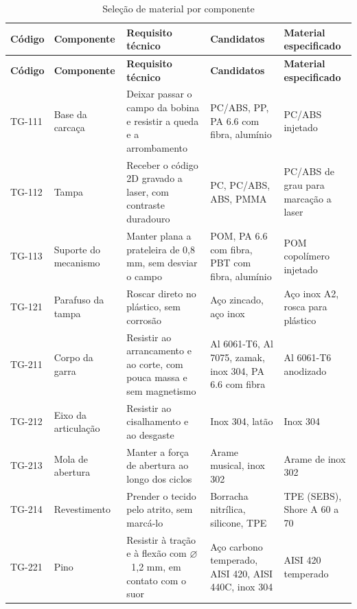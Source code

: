 \begingroup
\footnotesize
\renewcommand{\arraystretch}{1.25}
\begin{longtable}{@{}
    >{\RaggedRight\arraybackslash}p{1.3cm}
    >{\RaggedRight\arraybackslash}p{2.3cm}
    >{\RaggedRight\arraybackslash}p{3.8cm}
    >{\RaggedRight\arraybackslash}p{3.1cm}
    >{\RaggedRight\arraybackslash}p{3.8cm}@{}}
    \caption{Seleção de material por componente}\label{tab:const_selecao}\\
    \toprule
    \textbf{Código} & \textbf{Componente} & \textbf{Requisito técnico} & \textbf{Candidatos} & \textbf{Material especificado} \\
    \midrule
    \endfirsthead
    \toprule
    \textbf{Código} & \textbf{Componente} & \textbf{Requisito técnico} & \textbf{Candidatos} & \textbf{Material especificado} \\
    \midrule
    \endhead
    \bottomrule
    \endfoot
    TG-111 & Base da carcaça & Deixar passar o campo da bobina e resistir a queda e a arrombamento & PC/ABS, PP, PA 6.6 com fibra, alumínio & PC/ABS injetado \\
    TG-112 & Tampa & Receber o código 2D gravado a laser, com contraste duradouro & PC, PC/ABS, ABS, PMMA & PC/ABS de grau para marcação a laser \\
    TG-113 & Suporte do mecanismo & Manter plana a prateleira de 0,8 mm, sem desviar o campo & POM, PA 6.6 com fibra, PBT com fibra, alumínio & POM copolímero injetado \\
    TG-121 & Parafuso da tampa & Roscar direto no plástico, sem corrosão & Aço zincado, aço inox & Aço inox A2, rosca para plástico \\
    \midrule
    TG-211 & Corpo da garra & Resistir ao arrancamento e ao corte, com pouca massa e sem magnetismo & Al 6061-T6, Al 7075, zamak, inox 304, PA 6.6 com fibra & Al 6061-T6 anodizado \\
    TG-212 & Eixo da articulação & Resistir ao cisalhamento e ao desgaste & Inox 304, latão & Inox 304 \\
    TG-213 & Mola de abertura & Manter a força de abertura ao longo dos ciclos & Arame musical, inox 302 & Arame de inox 302 \\
    TG-214 & Revestimento & Prender o tecido pelo atrito, sem marcá-lo & Borracha nitrílica, silicone, TPE & TPE (SEBS), Shore A 60 a 70 \\
    TG-221 & Pino & Resistir à tração e à flexão com $\varnothing$~1,2 mm, em contato com o suor & Aço carbono temperado, AISI 420, AISI 440C, inox 304 & AISI 420 temperado \\

\end{longtable}
